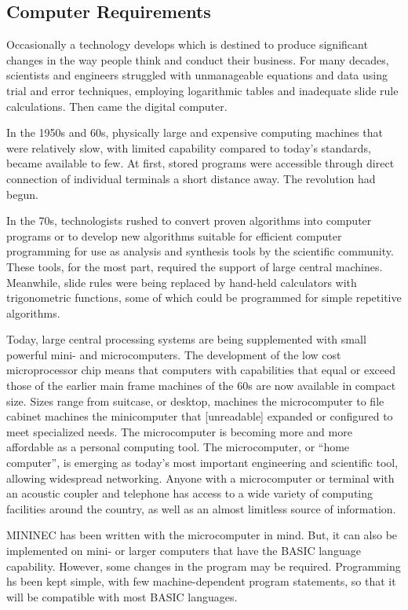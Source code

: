 \documentclass[12pt]{article}
\begin{document}
\subsection{Computer Requirements}
Occasionally a technology develops which is destined to produce
significant changes in the way people think and conduct their business.
For many decades, scientists and engineers struggled with unmanageable
equations and data using trial and error techniques, employing
logarithmic tables and inadequate slide rule calculations. Then came the
digital computer.

In the 1950s and 60s, physically large and expensive computing machines
that were relatively slow, with limited capability compared to today's
standards, became available to few. At first, stored programs were
accessible through direct connection of individual terminals a short
distance away. The revolution had begun.

In the 70s, technologists rushed to convert proven algorithms into
computer programs or to develop new algorithms suitable for efficient
computer programming for use as analysis and synthesis tools by the
scientific community. These tools, for the most part, required the
support of large central machines. Meanwhile, slide rules were being
replaced by hand-held calculators with trigonometric functions, some of
which could be programmed for simple repetitive algorithms.

Today, large central processing systems are being supplemented with
small powerful mini- and microcomputers. The development of the low cost
microprocessor chip means that computers with capabilities that equal or
exceed those of the earlier main frame machines of the 60s are now
available in compact size. Sizes range from suitcase, or desktop,
machines the microcomputer to file cabinet machines the minicomputer
that [unreadable] expanded or configured to meet specialized needs. The
microcomputer is becoming more and more affordable as a personal
computing tool. The microcomputer, or ``home computer'', is emerging as
today's most important engineering and scientific tool, allowing
widespread networking. Anyone with a microcomputer or terminal with an
acoustic coupler and telephone has access to a wide variety of computing
facilities around the country, as well as an almost limitless source of
information.

MININEC has been written with the microcomputer in mind. But, it can
also be implemented on mini- or larger computers that have the BASIC
language capability. However, some changes in the program may be
required. Programming hs been kept simple, with few machine-dependent
program statements, so that it will be compatible with most BASIC
languages.
\end{document}
